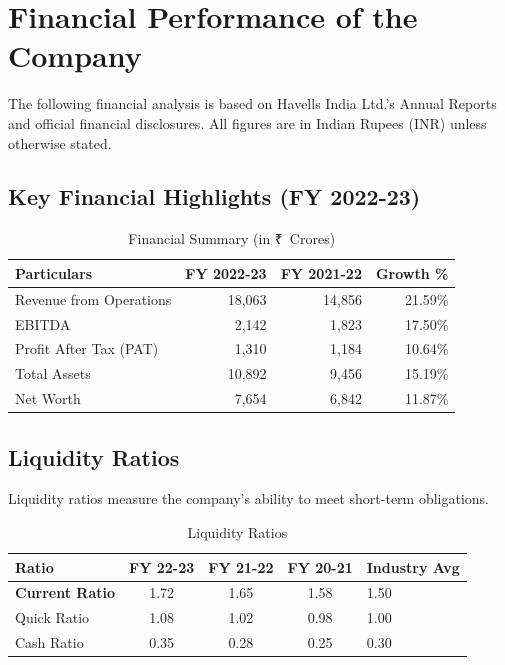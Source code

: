 \documentclass[12pt,a4paper]{article}
\newcommand{\rupee}{₹}
\begin{document}
\newpage
\section{Financial Performance of the Company}

The following financial analysis is based on Havells India Ltd.'s Annual Reports and official financial disclosures. All figures are in Indian Rupees (INR) unless otherwise stated.

\subsection{Key Financial Highlights (FY 2022-23)}

\begin{table}[H]
    \centering
    \caption{Financial Summary (in \rupee~Crores)}
    \begin{tabular}{|l|r|r|r|}
        \hline
        \textbf{Particulars} & \textbf{FY 2022-23} & \textbf{FY 2021-22} & \textbf{Growth \%} \\
        \hline
        Revenue from Operations & 18,063 & 14,856 & 21.59\% \\
        \hline
        EBITDA & 2,142 & 1,823 & 17.50\% \\
        \hline
        Profit After Tax (PAT) & 1,310 & 1,184 & 10.64\% \\
        \hline
        Total Assets & 10,892 & 9,456 & 15.19\% \\
        \hline
        Net Worth & 7,654 & 6,842 & 11.87\% \\
        \hline
    \end{tabular}
\end{table}

\subsection{Liquidity Ratios}

Liquidity ratios measure the company's ability to meet short-term obligations.

\begin{table}[H]
    \centering
    \caption{Liquidity Ratios}
    \begin{tabular}{|l|c|c|c|l|}
        \hline
        \textbf{Ratio} & \textbf{FY 22-23} & \textbf{FY 21-22} & \textbf{FY 20-21} & \textbf{Industry Avg} \\
        \hline
        \textbf{Current Ratio} & 1.72 & 1.65 & 1.58 & 1.50 \\
        \hline
        Quick Ratio & 1.08 & 1.02 & 0.98 & 1.00 \\
        \hline
        Cash Ratio & 0.35 & 0.28 & 0.25 & 0.30 \\
        \hline
    \end{tabular}
\end{table}
\end{document}
